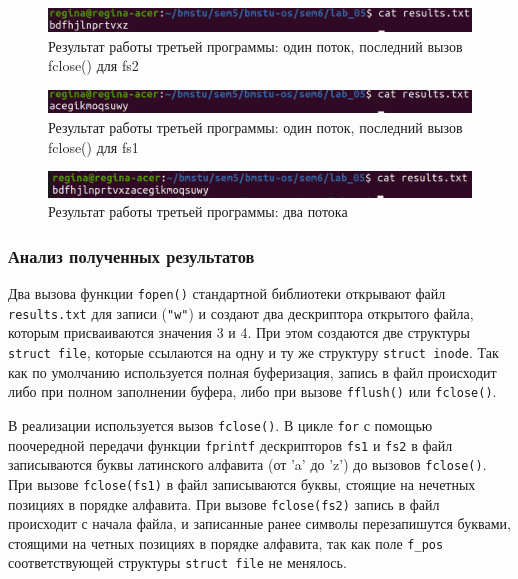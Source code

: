 \begin{figure}[H]
	\begin{center}
		\includegraphics[scale=0.3]{img/task31.png}
	\end{center}
	\captionsetup{justification=centering}
	\caption{Результат работы третьей программы: один поток, последний вызов fclose() для fs2}
	\label{img:task31}
\end{figure}

\begin{figure}[H]
	\begin{center}
		\includegraphics[scale=0.3]{img/task312.png}
	\end{center}
	\captionsetup{justification=centering}
	\caption{Результат работы третьей программы: один поток, последний вызов fclose() для fs1}
	\label{img:task312}
\end{figure}

\begin{figure}[H]
	\begin{center}
		\includegraphics[scale=0.3]{img/task32.png}
	\end{center}
	\captionsetup{justification=centering}
	\caption{Результат работы третьей программы: два потока}
	\label{img:task32}
\end{figure}

\subsubsection{Анализ полученных результатов}

Два вызова функции \texttt{fopen()} стандартной библиотеки открывают файл \texttt{results.txt} для записи (\texttt{"w"}) и создают два дескриптора открытого файла, которым присваиваются значения 3 и 4. При этом создаются две структуры \texttt{struct file}, которые ссылаются на одну и ту же структуру \texttt{struct inode}. Так как по умолчанию используется полная буферизация, запись в файл происходит либо при полном заполнении буфера, либо при вызове \texttt{fflush()} или \texttt{fclose()}. 

В реализации используется вызов \texttt{fclose()}. В цикле \texttt{for} с помощью поочередной передачи функции \texttt{fprintf} дескрипторов \texttt{fs1} и \texttt{fs2} в файл записываются буквы латинского алфавита (от 'a' до 'z') до вызовов \texttt{fclose()}. При вызове \texttt{fclose(fs1)} в файл записываются буквы, стоящие на нечетных позициях в порядке алфавита. При вызове \texttt{fclose(fs2)} запись в файл происходит с начала файла, и записанные ранее символы перезапишутся буквами, стоящими на четных позициях в порядке алфавита, так как поле \texttt{f\_pos} соответствующей структуры \texttt{struct file} не менялось. 


